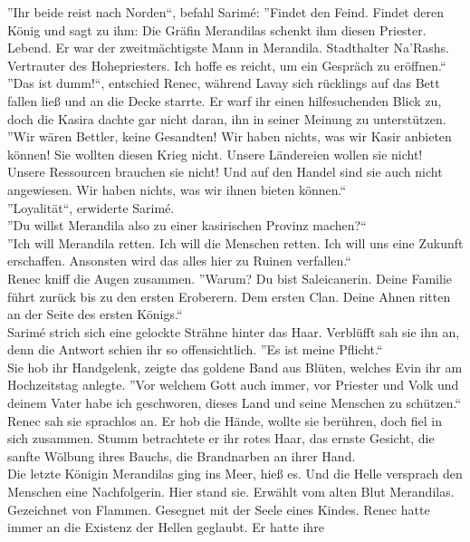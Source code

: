''Ihr beide reist nach Norden``, befahl Sarimé: ''Findet den Feind. Findet deren König und 
sagt zu ihm: Die Gräfin Merandilas schenkt ihm diesen Priester. Lebend. Er war der zweitmächtigste 
Mann in Merandila. Stadthalter Na'Rashs. Vertrauter des Hohepriesters. Ich hoffe es reicht, um ein 
Gespräch zu eröffnen.``\\
''Das ist dumm!``, entschied Renec, während Lavay sich rücklings auf das Bett fallen ließ und an 
die Decke starrte. Er warf ihr einen hilfesuchenden Blick zu, doch die Kasira dachte gar nicht 
daran, ihn in seiner Meinung zu unterstützen.\\
''Wir wären Bettler, keine Gesandten! Wir haben nichts, was wir Kasir anbieten können! Sie wollten 
diesen Krieg nicht. Unsere Ländereien wollen sie nicht! Unsere Ressourcen brauchen sie nicht! Und 
auf den Handel sind sie auch nicht angewiesen. Wir haben nichts, was wir ihnen bieten können.``\\
''Loyalität``, erwiderte Sarimé.\\
''Du willst Merandila also zu einer kasirischen Provinz machen?``\\
''Ich will Merandila retten. Ich will die Menschen retten. Ich will uns eine Zukunft erschaffen. 
Ansonsten wird das alles hier zu Ruinen verfallen.``\\
Renec kniff die Augen zusammen. ''Warum? Du bist Saleicanerin. Deine Familie führt zurück bis zu 
den ersten Eroberern. Dem ersten Clan. Deine Ahnen ritten an der Seite des ersten Königs.``\\
Sarimé strich sich eine gelockte Strähne hinter das Haar. Verblüfft sah sie ihn an, denn die 
Antwort schien ihr so offensichtlich. ''Es ist meine Pflicht.``\\
Sie hob ihr Handgelenk, zeigte das goldene Band aus Blüten, welches Evin ihr am Hochzeitstag 
anlegte. ''Vor welchem Gott auch immer, vor Priester und Volk und deinem Vater habe ich geschworen, 
dieses Land und seine Menschen zu schützen.``\\
Renec sah sie sprachlos an. Er hob die Hände, wollte sie berühren, doch fiel in sich zusammen. 
Stumm betrachtete er ihr rotes Haar, das ernste Gesicht, die sanfte Wölbung ihres Bauchs, die 
Brandnarben an ihrer Hand.\\
Die letzte Königin Merandilas ging ins Meer, hieß es. Und die Helle versprach den Menschen eine 
Nachfolgerin. Hier stand sie. Erwählt vom alten Blut Merandilas. Gezeichnet von Flammen. Gesegnet 
mit der Seele eines Kindes. Renec hatte immer an die Existenz der Hellen geglaubt. Er hatte ihre 
